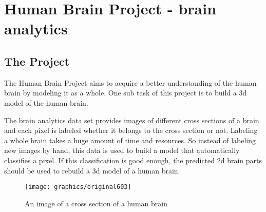 
\section{Human Brain Project - brain analytics}


\subsection{The Project}

The Human Brain Project aims to acquire a better understanding of
the human brain by modeling it as a whole. One sub task of this project
is to build a 3d model of the human brain.

The brain analytics data set provides images of different cross sections
of a brain and each pixel is labeled whether it belongs to the cross
section or not. Labeling a whole brain takes a huge amount of time
and resources. So instead of labeling new images by hand, this data
is used to build a model that automatically classifies a pixel. If
this classification is good enough, the predicted 2d brain parts should
be used to rebuild a 3d model of a human brain. 

\begin{figure}[h] \centering \texttt{[image: graphics/original603]} \caption{An image of a cross section of a human brain} \label{fig:original603} \end{figure}
